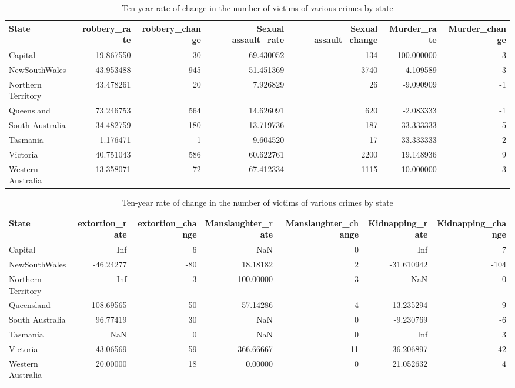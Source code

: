 \documentclass[11pt,a4paper,]{article}
\begin{document}
\begin{table}

\caption{\label{tab:table1}Ten-year rate of change in the number of victims of various crimes by state}
\centering
\begin{tabular}[t]{lrrrrrr}
\toprule
State & robbery\_rate & robbery\_change & Sexual assault\_rate & Sexual assault\_change & Murder\_rate & Murder\_change\\
\midrule
Capital & -19.867550 & -30 & 69.430052 & 134 & -100.000000 & -3\\
NewSouthWales & -43.953488 & -945 & 51.451369 & 3740 & 4.109589 & 3\\
Northern Territory & 43.478261 & 20 & 7.926829 & 26 & -9.090909 & -1\\
Queensland & 73.246753 & 564 & 14.626091 & 620 & -2.083333 & -1\\
South Australia & -34.482759 & -180 & 13.719736 & 187 & -33.333333 & -5\\
\addlinespace
Tasmania & 1.176471 & 1 & 9.604520 & 17 & -33.333333 & -2\\
Victoria & 40.751043 & 586 & 60.622761 & 2200 & 19.148936 & 9\\
Western Australia & 13.358071 & 72 & 67.412334 & 1115 & -10.000000 & -3\\
\bottomrule
\end{tabular}
\end{table}

\begin{table}

\caption{\label{tab:table2}Ten-year rate of change in the number of victims of various crimes by state}
\centering
\begin{tabular}[t]{lrrrrrr}
\toprule
State & extortion\_rate & extortion\_change & Manslaughter\_rate & Manslaughter\_change & Kidnapping\_rate & Kidnapping\_change\\
\midrule
Capital & Inf & 6 & NaN & 0 & Inf & 7\\
NewSouthWales & -46.24277 & -80 & 18.18182 & 2 & -31.610942 & -104\\
Northern Territory & Inf & 3 & -100.00000 & -3 & NaN & 0\\
Queensland & 108.69565 & 50 & -57.14286 & -4 & -13.235294 & -9\\
South Australia & 96.77419 & 30 & NaN & 0 & -9.230769 & -6\\
\addlinespace
Tasmania & NaN & 0 & NaN & 0 & Inf & 3\\
Victoria & 43.06569 & 59 & 366.66667 & 11 & 36.206897 & 42\\
Western Australia & 20.00000 & 18 & 0.00000 & 0 & 21.052632 & 4\\
\bottomrule
\end{tabular}
\end{table}
\end{document}
